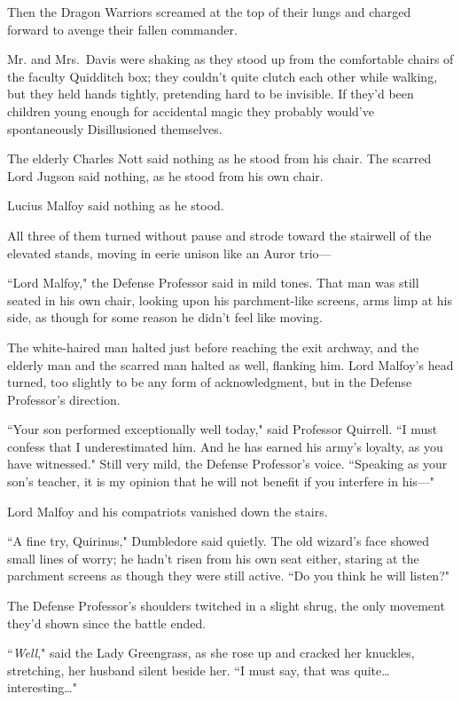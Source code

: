 Then the Dragon Warriors screamed at the top of their lungs and charged forward to avenge their fallen commander.

\later

Mr. and Mrs.~Davis were shaking as they stood up from the comfortable chairs of the faculty Quidditch box; they couldn't quite clutch each other while walking, but they held hands tightly, pretending hard to be invisible. If they'd been children young enough for accidental magic they probably would've spontaneously Disillusioned themselves.

The elderly Charles Nott said nothing as he stood from his chair. The scarred Lord Jugson said nothing, as he stood from his own chair.

Lucius Malfoy said nothing as he stood.

All three of them turned without pause and strode toward the stairwell of the elevated stands, moving in eerie unison like an Auror trio—

``Lord Malfoy," the Defense Professor said in mild tones. That man was still seated in his own chair, looking upon his parchment-like screens, arms limp at his side, as though for some reason he didn't feel like moving.

The white-haired man halted just before reaching the exit archway, and the elderly man and the scarred man halted as well, flanking him. Lord Malfoy's head turned, too slightly to be any form of acknowledgment, but in the Defense Professor's direction.

``Your son performed exceptionally well today," said Professor Quirrell. ``I must confess that I underestimated him. And he has earned his army's loyalty, as you have witnessed." Still very mild, the Defense Professor's voice. ``Speaking as your son's teacher, it is my opinion that he will not benefit if you interfere in his—"

Lord Malfoy and his compatriots vanished down the stairs.

``A fine try, Quirinus," Dumbledore said quietly. The old wizard's face showed small lines of worry; he hadn't risen from his own seat either, staring at the parchment screens as though they were still active. ``Do you think he will listen?"

The Defense Professor's shoulders twitched in a slight shrug, the only movement they'd shown since the battle ended.

``\emph{Well}," said the Lady Greengrass, as she rose up and cracked her knuckles, stretching, her husband silent beside her. ``I must say, that was quite{\ldots} interesting{\ldots}"

